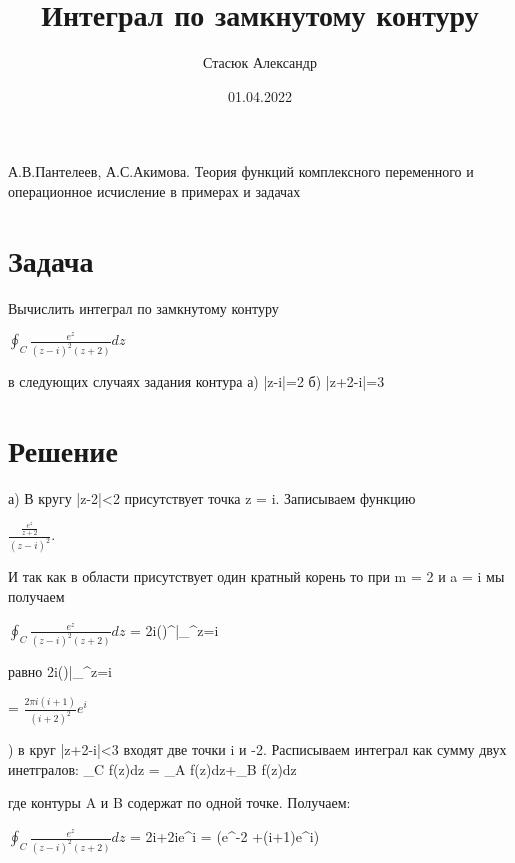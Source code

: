 \documentclass{article}
\title{Интеграл по замкнутому контуру}
\author{Стасюк Александр}
\date{01.04.2022}
\begin{document}
\maketitle
\begin{thebibliography}{1}

А.В.Пантелеев, А.С.Акимова. Теория функций комплексного переменного
и операционное исчисление в примерах и задачах

\end{thebibliography}
\section{Задача}

Вычислить интеграл по замкнутому контуру

$\oint_C \frac{e^z}{(z-i)^2(z+2)}dz$

в следующих случаях задания контура а) |z-i|=2 б) |z+2-i|=3

\section{Решение}

а) В кругу |z-2|<2 присутствует точка z = i. Записываем
функцию

$\frac{\frac{e^z}{z+2}}{(z-i)^2}$.

И так как в области присутствует один кратный корень то при m = 2 и a = i мы получаем

\par \noindent$\oint_C \frac{e^z}{(z-i)^2(z+2)}dz$ = 2\pi i()^\prime\bigg|_^z=i
\par{} равно 2\pi i()|_^z=i
\par\noindent= $\frac{2\pi i(i+1)}{(i+2)^2}e^i$
\par{}) в круг |z+2-i|<3 входят две точки i и -2. Расписываем интеграл как сумму двух инетгралов: \oint_C f(z)dz = \oint_A f(z)dz+\oint_B f(z)dz
\par\noindent где контуры A и B содержат по одной точке. Получаем:
\par\noindent$\oint_C \frac{e^z}{(z-i)^2(z+2)}dz$ = 2\pi i+2\pi ie^i = (e^-2 +(i+1)e^i)
\end{document}
